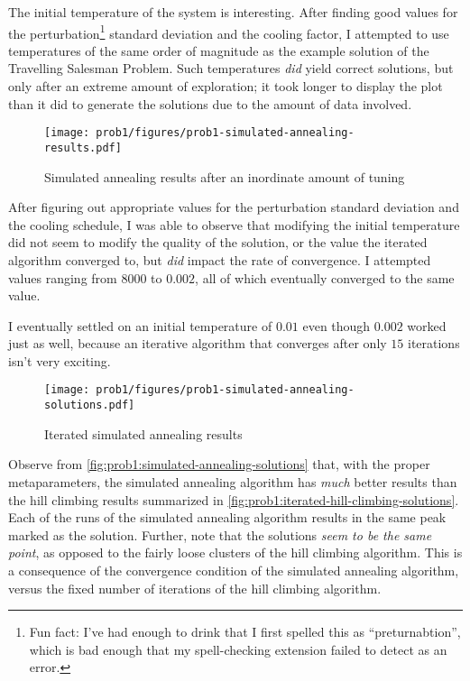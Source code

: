 \documentclass{article}
\begin{document}
The initial temperature of the system is interesting. After finding good values for the
perturbation\footnote{Fun fact: I've had enough to drink that I first spelled this as
    ``preturnabtion'', which is bad enough that my spell-checking extension failed to detect as an
    error.} standard deviation and the cooling factor, I attempted to use temperatures of the same
order of magnitude as the example solution of the Travelling Salesman Problem. Such temperatures
\textit{did} yield correct solutions, but only after an extreme amount of exploration; it took
longer to display the plot than it did to generate the solutions due to the amount of data
involved.

\begin{figure}[H]
    \centering
    \texttt{[image: prob1/figures/prob1-simulated-annealing-results.pdf]}
    \caption{Simulated annealing results after an inordinate amount of
        tuning}\label{fig:prob1:simulated-annealing-results}
\end{figure}

After figuring out appropriate values for the perturbation standard deviation and the cooling
schedule, I was able to observe that modifying the initial temperature did not seem to modify the
quality of the solution, or the value the iterated algorithm converged to, but \textit{did} impact
the rate of convergence. I attempted values ranging from $8000$ to $0.002$, all of which eventually
converged to the same value.

I eventually settled on an initial temperature of $0.01$ even though $0.002$ worked just as well,
because an iterative algorithm that converges after only $15$ iterations isn't very exciting.

\begin{figure}[h]
    \centering
    \texttt{[image: prob1/figures/prob1-simulated-annealing-solutions.pdf]}
    \caption{Iterated simulated annealing results}\label{fig:prob1:simulated-annealing-solutions}
\end{figure}

Observe from \autoref{fig:prob1:simulated-annealing-solutions} that, with the proper
metaparameters, the simulated annealing algorithm has \textit{much} better results than the hill
climbing results summarized in \autoref{fig:prob1:iterated-hill-climbing-solutions}. Each of the
runs of the simulated annealing algorithm results in the same peak marked as the solution. Further,
note that the solutions \textit{seem to be the same point}, as opposed to the fairly loose clusters
of the hill climbing algorithm. This is a consequence of the convergence condition of the simulated
annealing algorithm, versus the fixed number of iterations of the hill climbing algorithm.
\end{document}
